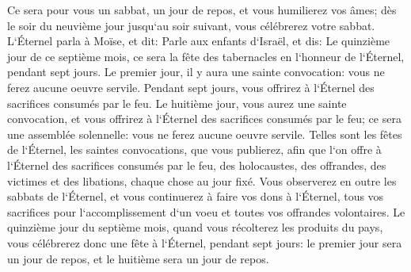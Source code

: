 \verse Ce sera pour vous un sabbat, un jour de repos, et vous humilierez vos âmes; dès le soir du neuvième jour jusqu`au soir suivant, vous célébrerez votre sabbat. 
\verse L`Éternel parla à Moïse, et dit: 
\verse Parle aux enfants d`Israël, et dis: Le quinzième jour de ce septième mois, ce sera la fête des tabernacles en l`honneur de l`Éternel, pendant sept jours. 
\verse Le premier jour, il y aura une sainte convocation: vous ne ferez aucune oeuvre servile. 
\verse Pendant sept jours, vous offrirez à l`Éternel des sacrifices consumés par le feu. Le huitième jour, vous aurez une sainte convocation, et vous offrirez à l`Éternel des sacrifices consumés par le feu; ce sera une assemblée solennelle: vous ne ferez aucune oeuvre servile. 
\verse Telles sont les fêtes de l`Éternel, les saintes convocations, que vous publierez, afin que l`on offre à l`Éternel des sacrifices consumés par le feu, des holocaustes, des offrandes, des victimes et des libations, chaque chose au jour fixé. 
\verse Vous observerez en outre les sabbats de l`Éternel, et vous continuerez à faire vos dons à l`Éternel, tous vos sacrifices pour l`accomplissement d`un voeu et toutes vos offrandes volontaires. 
\verse Le quinzième jour du septième mois, quand vous récolterez les produits du pays, vous célébrerez donc une fête à l`Éternel, pendant sept jours: le premier jour sera un jour de repos, et le huitième sera un jour de repos. 
